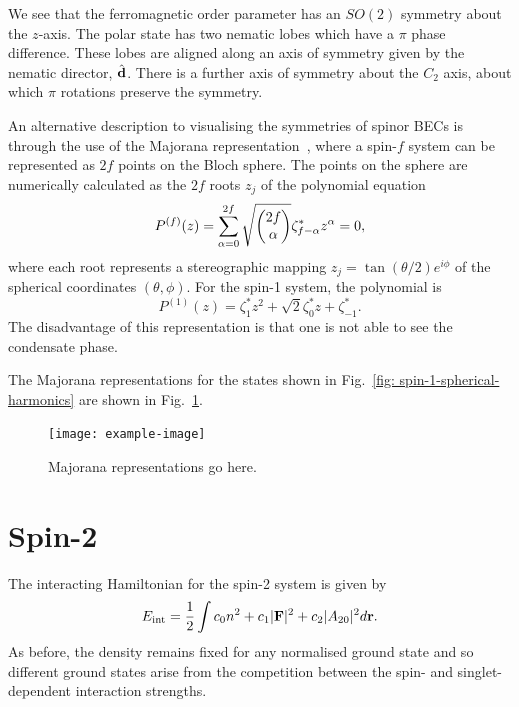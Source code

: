 We see that the ferromagnetic order parameter has an \(SO(2)\) symmetry about
the \(z\)-axis.
The polar state has two nematic lobes which have a \(\pi \) phase difference.
These lobes are aligned along an axis of symmetry given by the nematic director,
\(\hat{\vb{d}}\).
There is a further axis of symmetry about the \(C_2\) axis, about which \(\pi \)
rotations preserve the symmetry.

An alternative description to visualising the symmetries of spinor BECs is
through the use of the Majorana representation~\cite{Majorana1932,Bloch1945},
where a spin-\(f\) system can be represented as \(2f\) points on the Bloch
sphere.
The points on the sphere are numerically calculated as the \(2f\) roots
\(z_j\) of the polynomial equation
\begin{equation}
    P^{(f)}(z) = \sum_{\alpha = 0}^{2f}
    \sqrt{\mqty(2f \\ \alpha)}\zeta_{f-\alpha}^*z^\alpha=0,
\end{equation}
where each root represents a stereographic mapping
\(z_j=\tan(\theta/2)e^{i\phi}\) of the spherical coordinates \((\theta, \phi)\).
For the spin-1 system, the polynomial is
\begin{equation}
    P^{(1)}(z) = \zeta_1^*z^2+\sqrt{2}\zeta_0^*z+\zeta_{-1}^*.
\end{equation}
The disadvantage of this representation is that one is not able to see the
condensate phase.

The Majorana representations for the states shown in
Fig.~\ref{fig: spin-1-spherical-harmonics} are shown in
Fig.~\ref{fig: spin-1-majorana}.
\begin{figure}
    \centering
    \texttt{[image: example-image]}
    \caption[Majorana representation of spin-1 ground states]
    {\label{fig: spin-1-majorana}Majorana representations go here.}
\end{figure}

\section{Spin-2}
The interacting Hamiltonian for the spin-2 system is given by
\begin{equation}
    E_\mathrm{int} = \frac{1}{2}\int c_0n^2 + c_1|\vb{F}|^2+c_2|A_{20}|^2
    d\vb{r}.
\end{equation}
As before, the density remains fixed for any normalised ground state and so
different ground states arise from the competition between the spin-
and singlet-dependent interaction strengths.


